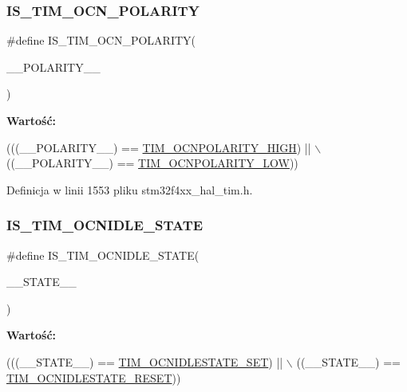 \subsubsection{\texorpdfstring{I\+S\+\_\+\+T\+I\+M\+\_\+\+O\+C\+N\+\_\+\+P\+O\+L\+A\+R\+I\+TY}{IS\_TIM\_OCN\_POLARITY}}
{\footnotesize\ttfamily \#define I\+S\+\_\+\+T\+I\+M\+\_\+\+O\+C\+N\+\_\+\+P\+O\+L\+A\+R\+I\+TY(\begin{DoxyParamCaption}\item[{}]{\+\_\+\+\_\+\+P\+O\+L\+A\+R\+I\+T\+Y\+\_\+\+\_\+ }\end{DoxyParamCaption})}

{\bfseries Wartość\+:}
\begin{DoxyCode}
(((\_\_POLARITY\_\_) == \hyperlink{group___t_i_m___output___compare___n___polarity_gad5dbeb61519e4fd55db3a4d136e96316}{TIM\_OCNPOLARITY\_HIGH}) || \(\backslash\)
                                            ((\_\_POLARITY\_\_) == 
      \hyperlink{group___t_i_m___output___compare___n___polarity_gadb44419c891a58e2cde11cc016f71a14}{TIM\_OCNPOLARITY\_LOW}))
\end{DoxyCode}


Definicja w linii 1553 pliku stm32f4xx\+\_\+hal\+\_\+tim.\+h.

\mbox{\label{group___t_i_m___private___macros_ga716c8082a9f18e07c876aa528a3f128d}} 
\subsubsection{\texorpdfstring{I\+S\+\_\+\+T\+I\+M\+\_\+\+O\+C\+N\+I\+D\+L\+E\+\_\+\+S\+T\+A\+TE}{IS\_TIM\_OCNIDLE\_STATE}}
{\footnotesize\ttfamily \#define I\+S\+\_\+\+T\+I\+M\+\_\+\+O\+C\+N\+I\+D\+L\+E\+\_\+\+S\+T\+A\+TE(\begin{DoxyParamCaption}\item[{}]{\+\_\+\+\_\+\+S\+T\+A\+T\+E\+\_\+\+\_\+ }\end{DoxyParamCaption})}

{\bfseries Wartość\+:}
\begin{DoxyCode}
(((\_\_STATE\_\_) == \hyperlink{group___t_i_m___output___compare___n___idle___state_ga1f781774c71822b2502633dfc849c5ea}{TIM\_OCNIDLESTATE\_SET}) || \(\backslash\)
                                            ((\_\_STATE\_\_) == 
      \hyperlink{group___t_i_m___output___compare___n___idle___state_ga7586655652e3c3f1cb4af1ed59d25901}{TIM\_OCNIDLESTATE\_RESET}))
\end{DoxyCode}


